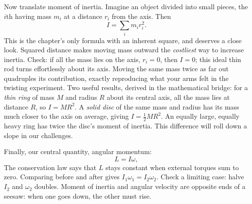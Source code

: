 \begin{mainline}
Now translate moment of inertia. Imagine an object divided into small pieces, the \(i\)th having mass \(m_i\) at a distance \(r_i\) from the axis. Then
\[
  I=\sum_i m_i r_i^2 .
\]
This is the chapter's only formula with an inherent square, and deserves a close look. Squared distance makes moving mass outward the \emph{costliest} way to increase inertia. Check: if all the mass lies on the axis, \(r_i=0\), then \(I=0\); this ideal thin rod turns effortlessly about its axis. Moving the same mass twice as far out quadruples its contribution, exactly reproducing what your arms felt in the twisting experiment. Two useful results, derived in the mathematical bridge: for a \emph{thin ring} of mass \(M\) and radius \(R\) about its central axis, all the mass lies at distance \(R\), so \(I=MR^2\). A \emph{solid disc} of the same mass and radius has its mass much closer to the axis on average, giving \(I=\tfrac12 MR^2\). An equally large, equally heavy ring has twice the disc's moment of inertia. This difference will roll down a slope in our challenges.

\begin{center}
\end{center}

Finally, our central quantity, angular momentum:
\[
  L=I\omega ,
\]
The conservation law says that \(L\) stays constant when external torques sum to zero. Comparing before and after gives \(I_1\omega_1=I_2\omega_2\). Check a limiting case: halve \(I_2\) and \(\omega_2\) doubles. Moment of inertia and angular velocity are opposite ends of a seesaw: when one goes down, the other must rise.
\end{mainline}

